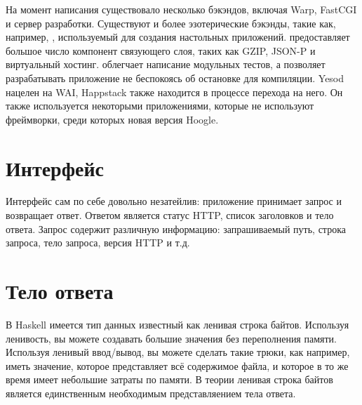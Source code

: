 На момент написания существовало несколько бэкэндов, включая Warp, FastCGI и
сервер разработки. Существуют и более эзотерические бэкэнды, такие как, например,
,
используемый для создания настольных приложений.  предоставляет большое число компонент связующего слоя, таких как  GZIP, JSON-P
и виртуальный хостинг. 
облегчает написание модульных тестов, а  позволяет разрабатывать приложение не беспокоясь об остановке для компиляции.
Yesod нацелен на WAI, Happstack также находится в процессе перехода на него.
Он также используется некоторыми приложениями, которые не используют фреймворки, среди
которых новая версия Hoogle.


\section {Интерфейс}

Интерфейс сам по себе довольно незатейлив: приложение принимает запрос и возвращает
ответ. Ответом является статус HTTP, список заголовков и тело ответа.
Запрос содержит различную информацию: запрашиваемый путь, строка запроса, тело запроса,
версия HTTP и т.д.

\section {Тело ответа}

В Haskell имеется тип данных известный как ленивая строка байтов. Используя ленивость,
вы можете создавать большие значения без переполнения памяти. Используя ленивый ввод/вывод,
вы можете сделать такие трюки, как например, иметь значение, которое представляет всё 
содержимое файла, и которое в то же время имеет небольшие затраты по памяти. В теории
ленивая строка байтов является единственным необходимым представляением тела ответа.

